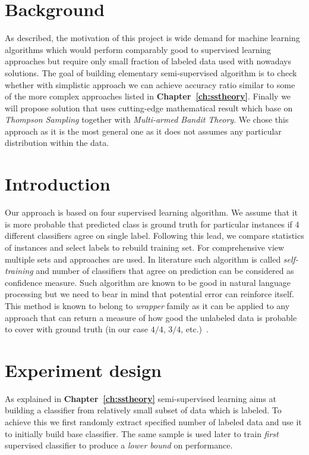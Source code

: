 \documentclass[12pt, a4paper, pdflatex]{report}
\begin{document}
\section{Background}
As described, the motivation of this project is wide demand for machine learning algorithms which would perform comparably good to supervised learning approaches but require only small fraction of labeled data used with nowadays solutions. The goal of building elementary semi-supervised algorithm is to check whether with simplistic approach we can achieve accuracy ratio similar to some of the more complex approaches listed in \textbf{Chapter~\ref{ch:sstheory}}. Finally we will propose solution that uses cutting-edge mathematical result which base on \emph{Thompson Sampling} together with \emph{Multi-armed Bandit Theory}. We chose this approach as it is the most general one as it does not assumes any particular distribution within the data.

\section{Introduction}
Our approach is based on four supervised learning algorithm. We assume that it is more probable that predicted class is ground truth for particular instances if 4 different classifiers agree on single label. Following this lead, we compare statistics of instances and select labels to rebuild training set. For comprehensive view multiple sets and approaches are used. In literature such algorithm is called \emph{self-training} and number of classifiers that agree on prediction can be considered as confidence measure. Such algorithm are known to be good in natural language processing but we need to bear in mind that potential error can reinforce itself. This method is known to belong to \emph{wrapper} family as it can be applied to any approach that can return a measure of how good the unlabeled data is probable to cover with ground truth (in our case $4/4$, $3/4$, etc.)~\cite{zhu2009introduction}.

\section{Experiment design}
As explained in \textbf{Chapter~\ref{ch:sstheory}} semi-supervised learning aims at building a classifier from relatively small subset of data which is labeled. To achieve this we first randomly extract specified number of labeled data and use it to initially build base classifier. The same sample is used later to train \emph{first} supervised classifier to produce a \emph{lower bound} on performance.
\end{document}
